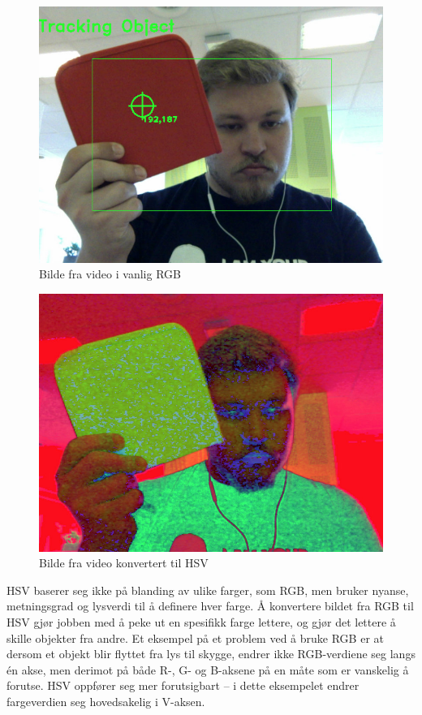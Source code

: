 \begin{figure}[h!]
	\centering
	\includegraphics[scale=0.45]{img/first-rgb.jpg}
	\caption[Første iterasjon RGB bilde]{Bilde fra video i vanlig RGB}
	\label{fig:firstiterationrgb}
\end{figure}

\begin{figure}[h!]
	\centering
	\includegraphics[scale=0.45]{img/first-hsv.jpg}
	\caption[Første iterasjon HSV bilde]{Bilde fra video konvertert til HSV}
	\label{fig:firstiterationhsv}
\end{figure}

HSV baserer seg ikke på blanding av ulike farger, som RGB, men bruker nyanse, metningsgrad og lysverdi til å definere hver farge. Å konvertere bildet fra RGB til HSV gjør jobben med å peke ut en spesifikk farge lettere, og gjør det lettere å skille objekter fra andre. Et eksempel på et problem ved å bruke RGB er at dersom et objekt blir flyttet fra lys til skygge, endrer ikke RGB-verdiene seg langs én akse, men derimot på både R-, G- og B-aksene på en måte som er vanskelig å forutse. HSV oppfører seg mer forutsigbart -- i dette eksempelet endrer fargeverdien seg hovedsakelig i V-aksen.

